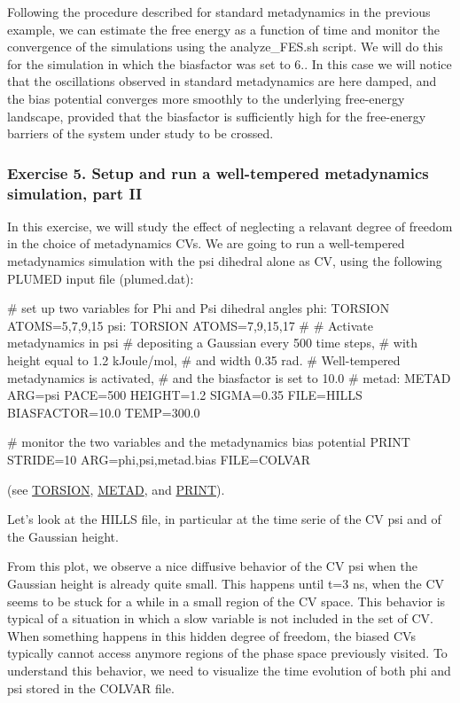 \label{belfast-6_belfast-6-wtb15-fig}%
\hypertarget{belfast-6_belfast-6-wtb15-fig}{}%
 Following the procedure described for standard metadynamics in the previous example, we can estimate the free energy as a function of time and monitor the convergence of the simulations using the analyze\+\_\+\+F\+E\+S.\+sh script. We will do this for the simulation in which the biasfactor was set to 6.. In this case we will notice that the oscillations observed in standard metadynamics are here damped, and the bias potential converges more smoothly to the underlying free-\/energy landscape, provided that the biasfactor is sufficiently high for the free-\/energy barriers of the system under study to be crossed.

\label{belfast-6_belfast-6-wtdifft-fig}%
\hypertarget{belfast-6_belfast-6-wtdifft-fig}{}%
\hypertarget{belfast-6_belfast-6-exercise-5}{}\subsubsection{Exercise 5. Setup and run a well-\/tempered metadynamics simulation, part I\+I}\label{belfast-6_belfast-6-exercise-5}
In this exercise, we will study the effect of neglecting a relavant degree of freedom in the choice of metadynamics C\+Vs. We are going to run a well-\/tempered metadynamics simulation with the psi dihedral alone as C\+V, using the following P\+L\+U\+M\+E\+D input file (plumed.\+dat)\+:

\begin{DoxyVerb}# set up two variables for Phi and Psi dihedral angles 
phi: TORSION ATOMS=5,7,9,15
psi: TORSION ATOMS=7,9,15,17
#
# Activate metadynamics in psi
# depositing a Gaussian every 500 time steps,
# with height equal to 1.2 kJoule/mol,
# and width 0.35 rad.
# Well-tempered metadynamics is activated,
# and the biasfactor is set to 10.0
#
metad: METAD ARG=psi PACE=500 HEIGHT=1.2 SIGMA=0.35 FILE=HILLS BIASFACTOR=10.0 TEMP=300.0

# monitor the two variables and the metadynamics bias potential
PRINT STRIDE=10 ARG=phi,psi,metad.bias FILE=COLVAR\end{DoxyVerb}
 (see \hyperlink{TORSION}{T\+O\+R\+S\+I\+O\+N}, \hyperlink{METAD}{M\+E\+T\+A\+D}, and \hyperlink{PRINT}{P\+R\+I\+N\+T}).

Let's look at the H\+I\+L\+L\+S file, in particular at the time serie of the C\+V psi and of the Gaussian height.

\label{belfast-6_belfast-6-phialone-fig}%
\hypertarget{belfast-6_belfast-6-phialone-fig}{}%
 From this plot, we observe a nice diffusive behavior of the C\+V psi when the Gaussian height is already quite small. This happens until t=3 ns, when the C\+V seems to be stuck for a while in a small region of the C\+V space. This behavior is typical of a situation in which a slow variable is not included in the set of C\+V. When something happens in this hidden degree of freedom, the biased C\+Vs typically cannot access anymore regions of the phase space previously visited. To understand this behavior, we need to visualize the time evolution of both phi and psi stored in the C\+O\+L\+V\+A\+R file.

